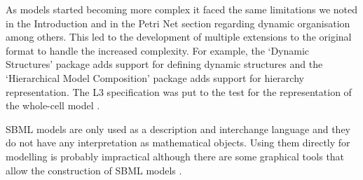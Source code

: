 As models started becoming more complex it faced the same limitations we noted
in the Introduction and in the Petri Net section regarding dynamic organisation
among others. This led to the development of multiple extensions to the original
format \citep[SBML L3;][]{sbmlL3} to handle the increased complexity. For
example, the `Dynamic Structures' package adds support for defining dynamic
structures and the `Hierarchical Model Composition' package adds support for
hierarchy representation. The L3 specification was put to the test for the
representation of the \citet{karr_whole-cell_2012} whole-cell model
\citep{waltemath_toward_2016}.

SBML models are only used as a description and interchange language and they do
not have any interpretation as mathematical objects. Using them directly for
modelling is probably impractical although there are some graphical tools that
allow the construction of SBML models \citep{hoops_copasicomplex_2006}.




